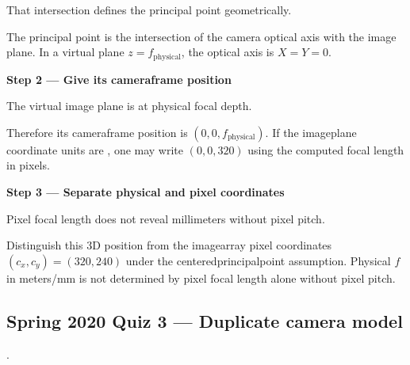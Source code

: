 \documentclass[letterpaper,11pt,english,openany,oneside]{jupyterBook}
\begin{document}
\sphinxAtStartPar
{} That intersection defines the principal point geometrically.

\sphinxAtStartPar
The principal point is the intersection of the camera optical axis with the image plane. In a virtual plane {\color{QuizMathBlue} \(z=f_{\mathrm{physical}}\)}, the optical axis is {\color{QuizMathBlue} \(X=Y=0\)}.

\par

\par\medskip{}
{\color{QuizStepRed}\bfseries Step 2 — Give its camera\sphinxhyphen{}frame position}\par\smallskip

\sphinxAtStartPar
{} The virtual image plane is at physical focal depth.

\sphinxAtStartPar
Therefore its camera\sphinxhyphen{}frame position is {\color{QuizMathBlue} \(\boxed{(0,0,f_{\mathrm{physical}})}\)}. If the image\sphinxhyphen{}plane coordinate units are , one may write {\color{QuizMathBlue} \((0,0,320)\)} using the computed focal length in pixels.

\par

\par\medskip{}
{\color{QuizStepRed}\bfseries Step 3 — Separate physical and pixel coordinates}\par\smallskip

\sphinxAtStartPar
{} Pixel focal length does not reveal millimeters without pixel pitch.

\sphinxAtStartPar
Distinguish this 3D position from the image\sphinxhyphen{}array pixel coordinates {\color{QuizMathBlue} \(\boxed{(c_x,c_y)=(320,240)}\)} under the centered\sphinxhyphen{}principal\sphinxhyphen{}point assumption. Physical {\color{QuizMathBlue} \(f\)} in meters/mm is not determined by pixel focal length alone without pixel pitch.

\par


\subsection{Spring 2020 Quiz 3 — Duplicate camera model}
\label{\detokenize{lectures/lecture03/quiz-workbook:spring-2020-quiz-3-duplicate-camera-model}}\label{\detokenize{lectures/lecture03/quiz-workbook:quiz-source-11}}
\sphinxAtStartPar
{} .
\end{document}

